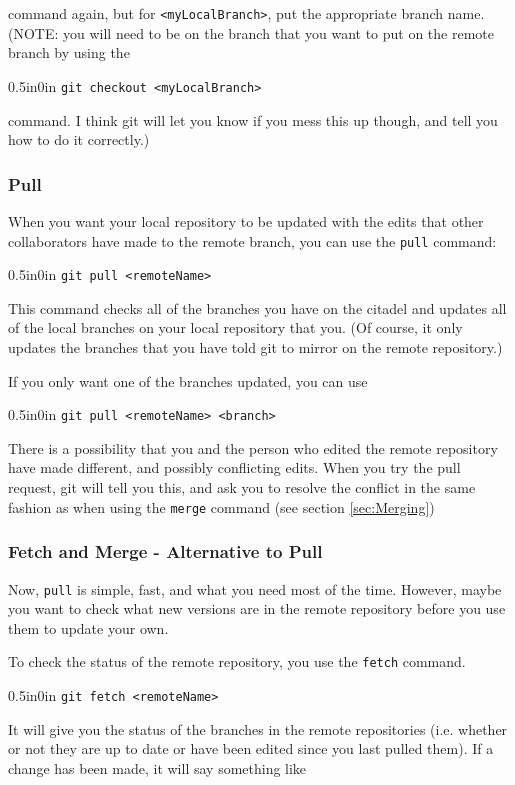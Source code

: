 \documentclass[11pt]{article}
\newcommand{\code}[1]{\begin{adjustwidth}{0.5in}{0in}
    \texttt{#1}
    \end{adjustwidth}}
\begin{document}
command again, but for \texttt{<myLocalBranch>}, put the appropriate branch name.  (NOTE: you will need to be on the branch that you want to put on the remote branch by using the \code{git checkout <myLocalBranch>} command.  I think git will let you know if you mess this up though, and tell you how to do it correctly.)

\subsubsection{Pull}

When you want your local repository to be updated with the edits that other collaborators have made to the remote branch, you can use the \texttt{pull} command:

\code{git pull <remoteName>}

This command checks all of the branches you have on the citadel and updates all of the local branches on your local repository that you.  (Of course, it only updates the branches that you have told git to mirror on the remote repository.)

If you only want one of the branches updated, you can use

\code{git pull <remoteName> <branch>}

There is a possibility that you and the person who edited the remote repository have made different, and possibly conflicting edits.  When you try the pull request, git will tell you this, and ask you to resolve the conflict in the same fashion as when using the \texttt{merge} command (see section \ref{sec:Merging})

\subsubsection{Fetch and Merge - Alternative to Pull}

Now, \texttt{pull} is simple, fast, and what you need most of the time.  However, maybe you want to check what new versions are in the remote repository before you use them to update your own.  

To check the status of the remote repository, you use the \texttt{fetch} command.

\code{git fetch <remoteName>}

It will give you the status of the branches in the remote repositories (i.e. whether or not they are up to date or have been edited since you last pulled them).  If a change has been made, it will say something like
\end{document}
